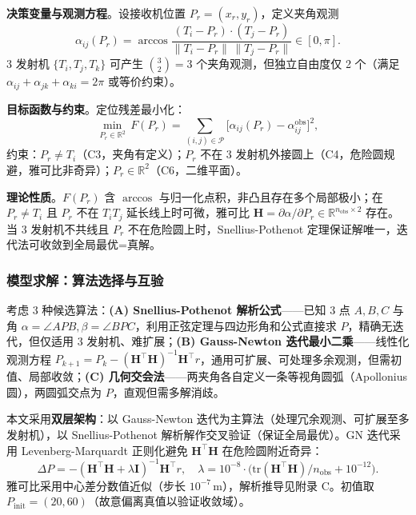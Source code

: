 \documentclass[12pt,a4paper]{ctexart}
\newcommand{\unit}[1]{\ensuremath{\,\mathrm{#1}}}
\begin{document}
\textbf{决策变量与观测方程}。设接收机位置 $P_r=(x_r,y_r)$，定义夹角观测
\begin{equation}
\alpha_{ij}(P_r)=\arccos\frac{(T_i-P_r)\cdot(T_j-P_r)}{\|T_i-P_r\|\,\|T_j-P_r\|}\in[0,\pi].
\label{eq:angle-obs}
\end{equation}
3 发射机 $\{T_i,T_j,T_k\}$ 可产生 $\binom{3}{2}=3$ 个夹角观测，但独立自由度仅 2 个（满足 $\alpha_{ij}+\alpha_{jk}+\alpha_{ki}=2\pi$ 或等价约束）。

\textbf{目标函数与约束}。定位残差最小化：
\begin{equation}
\min_{P_r\in\mathbb{R}^2}\, F(P_r)=\sum_{(i,j)\in\mathcal{P}}\bigl[\alpha_{ij}(P_r)-\alpha_{ij}^{\text{obs}}\bigr]^2,
\label{eq:q11-obj}
\end{equation}
约束：$P_r\neq T_i$（C3，夹角有定义）；$P_r$ 不在 3 发射机外接圆上（C4，危险圆规避，雅可比非奇异）；$P_r\in\mathbb{R}^2$（C6，二维平面）。

\textbf{理论性质}。$F(P_r)$ 含 $\arccos$ 与归一化点积，非凸且存在多个局部极小；在 $P_r\neq T_i$ 且 $P_r$ 不在 $T_iT_j$ 延长线上时可微，雅可比 $\mathbf{H}=\partial\alpha/\partial P_r\in\mathbb{R}^{n_{\text{obs}}\times 2}$ 存在。当 3 发射机不共线且 $P_r$ 不在危险圆上时，Snellius-Pothenot 定理保证解唯一，迭代法可收敛到全局最优=真解。

\subsubsection{模型求解：算法选择与互验}

考虑 3 种候选算法：\textbf{(A) Snellius-Pothenot 解析公式}——已知 3 点 $A,B,C$ 与角 $\alpha=\angle APB,\beta=\angle BPC$，利用正弦定理与四边形角和公式直接求 $P$，精确无迭代，但仅适用 3 发射机、难扩展；\textbf{(B) Gauss-Newton 迭代最小二乘}——线性化观测方程 $P_{k+1}=P_k-(\mathbf{H}^\top\mathbf{H})^{-1}\mathbf{H}^\top r$，通用可扩展、可处理多余观测，但需初值、局部收敛；\textbf{(C) 几何交会法}——两夹角各自定义一条等视角圆弧（Apollonius 圆），两圆弧交点为 $P$，直观但需多解消歧。

本文采用\textbf{双层架构}：以 Gauss-Newton 迭代为主算法（处理冗余观测、可扩展至多发射机），以 Snellius-Pothenot 解析解作交叉验证（保证全局最优）。GN 迭代采用 Levenberg-Marquardt 正则化避免 $\mathbf{H}^\top\mathbf{H}$ 在危险圆附近奇异：
\begin{equation}
\Delta P=-(\mathbf{H}^\top\mathbf{H}+\lambda\mathbf{I})^{-1}\mathbf{H}^\top r,\quad \lambda=10^{-8}\cdot\bigl(\text{tr}(\mathbf{H}^\top\mathbf{H})/n_{\text{obs}}+10^{-12}\bigr).
\label{eq:lm}
\end{equation}
雅可比采用中心差分数值近似（步长 $10^{-7}\unit{m}$），解析推导见附录 C。初值取 $P_{\text{init}}=(20,60)$（故意偏离真值以验证收敛域）。
\end{document}
